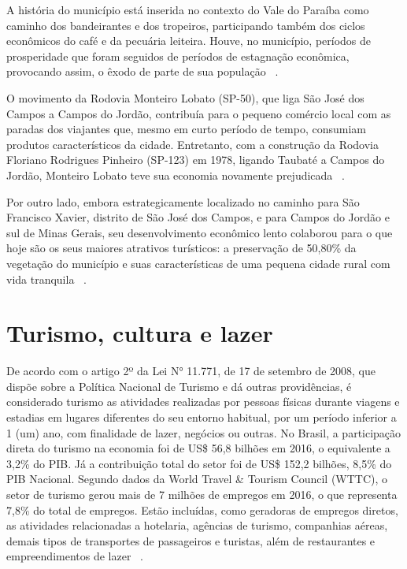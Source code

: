 A história do município está inserida no contexto do Vale do Paraíba como caminho dos bandeirantes e dos tropeiros, participando também dos ciclos econômicos do café e da pecuária leiteira. Houve, no município, períodos de prosperidade que foram seguidos de períodos de estagnação econômica, provocando assim, o êxodo de parte de sua população ~\cite{MonteiroLobato2014}.

O movimento da Rodovia Monteiro Lobato (SP-50), que liga São José dos Campos a Campos do Jordão, contribuía para o pequeno comércio local com as paradas dos viajantes que, mesmo em curto período de tempo, consumiam produtos característicos da cidade. Entretanto, com a construção da Rodovia Floriano Rodrigues Pinheiro (SP-123) em 1978, ligando Taubaté a Campos do Jordão, Monteiro Lobato teve sua economia novamente prejudicada ~\cite{MonteiroLobato2014}.

Por outro lado, embora estrategicamente localizado no caminho para São Francisco Xavier, distrito de São José dos Campos, e para Campos do Jordão e sul de Minas Gerais, seu desenvolvimento econômico lento colaborou para o que hoje são os seus maiores atrativos turísticos: a preservação de 50,80\% da vegetação do município e suas características de uma pequena cidade rural com vida tranquila ~\cite{MonteiroLobato2014}.

\section{Turismo, cultura e lazer}

De acordo com o artigo 2º da Lei N° 11.771, de 17 de setembro de 2008, que dispõe sobre a Política Nacional de Turismo e dá outras providências, é considerado turismo as atividades realizadas por pessoas físicas durante viagens e estadias em lugares diferentes do seu entorno habitual, por um período inferior a 1 (um) ano, com finalidade de lazer, negócios ou outras.
No Brasil, a participação direta do turismo na economia foi de US\$ 56,8 bilhões em 2016, o equivalente a 3,2\% do PIB. Já a contribuição total do setor foi de US\$ 152,2 bilhões, 8,5\% do PIB Nacional. Segundo dados da World Travel \& Tourism Council (WTTC), o setor de turismo gerou mais de 7 milhões de empregos em 2016, o que representa 7,8\% do total de empregos. Estão incluídas, como geradoras de empregos diretos, as atividades relacionadas a hotelaria, agências de turismo, companhias aéreas, demais tipos de transportes de passageiros e turistas, além de restaurantes e empreendimentos de lazer ~\cite{PNT2018}.

